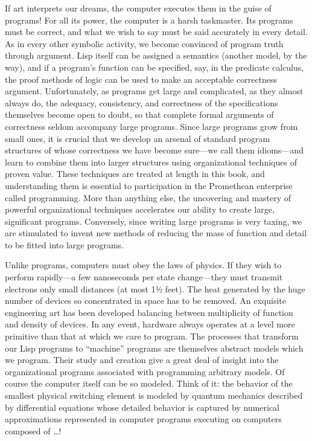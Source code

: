 If art interprets our dreams, the computer executes them in the guise of programs!
For all its power, the computer is a harsh taskmaster.
Its programs must be correct, and what we wish to say must be said accurately in every detail.
As in every other symbolic activity, we become convinced of program truth through argument.
Lisp itself can be assigned a semantics (another model, by the way), and if a program’s function can be specified, say, in the predicate calculus, the proof methods of logic can be used to make an acceptable correctness argument.
Unfortunately, as programs get large and complicated, as they almost always do, the adequacy, consistency, and correctness of the specifications themselves become open to doubt, so that complete formal arguments of correctness seldom accompany large programs.
Since large programs grow from small ones, it is crucial that we develop an arsenal of standard program structures of whose correctness we have become sure---we call them idioms---and learn to combine them into larger structures using organizational techniques of proven value.
These techniques are treated at length in this book, and understanding them is essential to participation in the Promethean enterprise called programming.
More than anything else, the uncovering and mastery of powerful organizational techniques accelerates our ability to create large, significant programs.
Conversely, since writing large programs is very taxing, we are stimulated to invent new methods of reducing the mass of function and detail to be fitted into large programs.

Unlike programs, computers must obey the laws of physics.
If they wish to perform rapidly---a few nanoseconds per state change---they must transmit
electrons only small distances (at most 1½ feet).
The heat generated by the huge number of devices so concentrated in space has to be removed.
An exquisite engineering art has been developed balancing between multiplicity of
function and density of devices.
In any event, hardware always operates at a level more primitive than that at which we care to program.
The processes that transform our Lisp programs to “machine” programs are themselves abstract
models which we program.
Their study and creation give a great deal of insight into the organizational programs associated with programming arbitrary models.
Of course the computer itself can be so modeled.
Think of it:
the behavior of the smallest physical switching element is modeled by quantum mechanics
described by differential equations whose detailed behavior is captured by
numerical approximations represented in computer programs executing on
computers composed of …!

